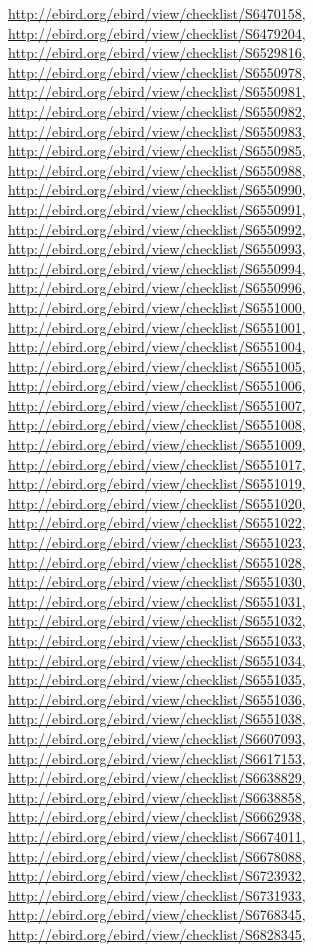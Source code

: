 \documentclass[9pt, article]{memoir}
\begin{document}
\begin{multicols}{2}
\url{http://ebird.org/ebird/view/checklist/S6470158}, 
\url{http://ebird.org/ebird/view/checklist/S6479204}, 
\url{http://ebird.org/ebird/view/checklist/S6529816}, 
\url{http://ebird.org/ebird/view/checklist/S6550978}, 
\url{http://ebird.org/ebird/view/checklist/S6550981}, 
\url{http://ebird.org/ebird/view/checklist/S6550982}, 
\url{http://ebird.org/ebird/view/checklist/S6550983}, 
\url{http://ebird.org/ebird/view/checklist/S6550985}, 
\url{http://ebird.org/ebird/view/checklist/S6550988}, 
\url{http://ebird.org/ebird/view/checklist/S6550990}, 
\url{http://ebird.org/ebird/view/checklist/S6550991}, 
\url{http://ebird.org/ebird/view/checklist/S6550992}, 
\url{http://ebird.org/ebird/view/checklist/S6550993}, 
\url{http://ebird.org/ebird/view/checklist/S6550994}, 
\url{http://ebird.org/ebird/view/checklist/S6550996}, 
\url{http://ebird.org/ebird/view/checklist/S6551000}, 
\url{http://ebird.org/ebird/view/checklist/S6551001}, 
\url{http://ebird.org/ebird/view/checklist/S6551004}, 
\url{http://ebird.org/ebird/view/checklist/S6551005}, 
\url{http://ebird.org/ebird/view/checklist/S6551006}, 
\url{http://ebird.org/ebird/view/checklist/S6551007}, 
\url{http://ebird.org/ebird/view/checklist/S6551008}, 
\url{http://ebird.org/ebird/view/checklist/S6551009}, 
\url{http://ebird.org/ebird/view/checklist/S6551017}, 
\url{http://ebird.org/ebird/view/checklist/S6551019}, 
\url{http://ebird.org/ebird/view/checklist/S6551020}, 
\url{http://ebird.org/ebird/view/checklist/S6551022}, 
\url{http://ebird.org/ebird/view/checklist/S6551023}, 
\url{http://ebird.org/ebird/view/checklist/S6551028}, 
\url{http://ebird.org/ebird/view/checklist/S6551030}, 
\url{http://ebird.org/ebird/view/checklist/S6551031}, 
\url{http://ebird.org/ebird/view/checklist/S6551032}, 
\url{http://ebird.org/ebird/view/checklist/S6551033}, 
\url{http://ebird.org/ebird/view/checklist/S6551034}, 
\url{http://ebird.org/ebird/view/checklist/S6551035}, 
\url{http://ebird.org/ebird/view/checklist/S6551036}, 
\url{http://ebird.org/ebird/view/checklist/S6551038}, 
\url{http://ebird.org/ebird/view/checklist/S6607093}, 
\url{http://ebird.org/ebird/view/checklist/S6617153}, 
\url{http://ebird.org/ebird/view/checklist/S6638829}, 
\url{http://ebird.org/ebird/view/checklist/S6638858}, 
\url{http://ebird.org/ebird/view/checklist/S6662938}, 
\url{http://ebird.org/ebird/view/checklist/S6674011}, 
\url{http://ebird.org/ebird/view/checklist/S6678088}, 
\url{http://ebird.org/ebird/view/checklist/S6723932}, 
\url{http://ebird.org/ebird/view/checklist/S6731933}, 
\url{http://ebird.org/ebird/view/checklist/S6768345}, 
\url{http://ebird.org/ebird/view/checklist/S6828345}, 

\end{multicols}
\end{document}
